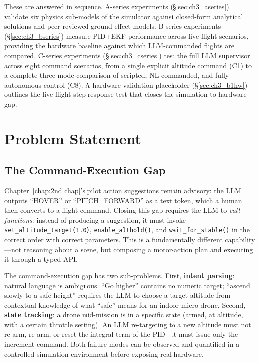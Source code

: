 These are answered in sequence. A-series experiments (\S\ref{sec:ch3_aseries})
validate six physics sub-models of the simulator against closed-form analytical
solutions and peer-reviewed ground-effect models. B-series experiments
(\S\ref{sec:ch3_bseries}) measure PID+EKF performance across five flight
scenarios, providing the hardware baseline against which LLM-commanded flights
are compared. C-series experiments (\S\ref{sec:ch3_cseries}) test the full
LLM supervisor across eight command scenarios, from a single explicit altitude
command (C1) to a complete three-mode comparison of scripted, NL-commanded,
and fully-autonomous control (C8). A hardware validation placeholder
(\S\ref{sec:ch3_b1hw}) outlines the live-flight step-response test that closes
the simulation-to-hardware gap.


\section{Problem Statement}
\label{sec:ch3_problem}

\subsection{The Command-Execution Gap}
\label{sec:ch3_problem_gap}

Chapter~\ref{chap:2nd chap}'s pilot action suggestions remain advisory: the LLM
outputs ``HOVER'' or ``PITCH\_FORWARD'' as a text token, which a human then
converts to a flight command. Closing this gap requires the LLM to \emph{call
functions}: instead of producing a suggestion, it must invoke
\texttt{set\_altitude\_target(1.0)}, \texttt{enable\_althold()}, and
\texttt{wait\_for\_stable()} in the correct order with correct parameters.
This is a fundamentally different capability---not reasoning about a scene, but
composing a motor-action plan and executing it through a typed API.

The command-execution gap has two sub-problems. First, \textbf{intent parsing}:
natural language is ambiguous. ``Go higher'' contains no numeric target; ``ascend
slowly to a safe height'' requires the LLM to choose a target altitude from
contextual knowledge of what ``safe'' means for an indoor micro-drone. Second,
\textbf{state tracking}: a drone mid-mission is in a specific state (armed, at
altitude, with a certain throttle setting). An LLM re-targeting to a new altitude
must not re-arm, re-arm, or reset the integral term of the PID---it must issue
only the increment command. Both failure modes can be observed and quantified in
a controlled simulation environment before exposing real hardware.

